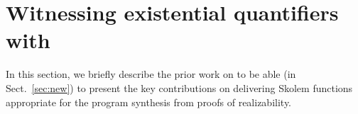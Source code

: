 \vspace{-1em}

\section{Witnessing existential quantifiers with \aeval}
\label{sec:aeval}


In this section, we briefly describe the prior work on \aeval to be able (in Sect.~\ref{sec:new}) to present the key contributions on delivering Skolem functions appropriate for the program synthesis from proofs of realizability.

